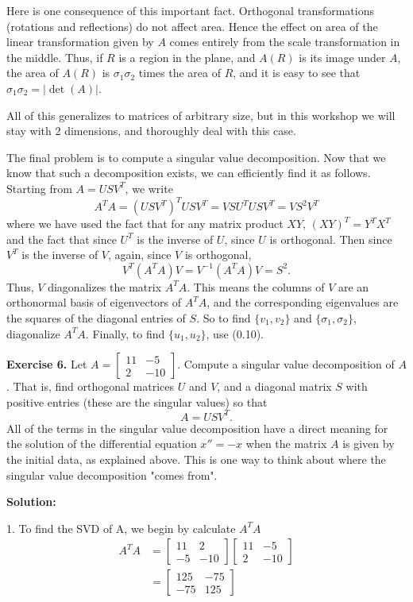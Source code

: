 \documentclass[12pt]{article}
\begin{document}
Here is one consequence of this important fact. Orthogonal transformations (rotations and reflections) do not affect area. Hence the effect on area of the linear transformation given by $A$ comes entirely from the scale transformation in the middle. Thus, if $R$ is a region in the plane, and $A(R)$ is its image under $A$, the area of $A(R)$ is $\sigma_{1}\sigma_{2}$ times the area of $R$, and it is easy to see that $\sigma_{1}\sigma_{2}=|\det(A)|$.

All of this generalizes to matrices of arbitrary size, but in this workshop we will stay with 2 dimensions, and thoroughly deal with this case.

The final problem is to compute a singular value decomposition. Now that we know that such a decomposition exists, we can efficiently find it as follows. Starting from $A=USV^{T}$, we write
\[
    A^{T}A=(USV^{T})^{T}USV^{T}=VSU^{T}USV^{T}=VS^{2}V^{T}
\]
where we have used the fact that for any matrix product $XY$, $(XY)^{T}=Y^{T}X^{T}$ and the fact that since $U^{T}$ is the inverse of $U$, since $U$ is orthogonal. Then since $V^{T}$ is the inverse of $V$, again, since $V$ is orthogonal,
\[
    V^{T}(A^{T}A)V=V^{-1}(A^{T}A)V=S^{2}.
\]
Thus, $V$ diagonalizes the matrix $A^{T}A$. This means the columns of $V$ are an orthonormal basis of eigenvectors of $A^{T}A$, and the corresponding eigenvalues are the squares of the diagonal entries of $S$. So to find $\{v_{1},v_{2}\}$ and $\{\sigma_{1},\sigma_{2}\}$, diagonalize $A^{T}A$. Finally, to find $\{u_{1},u_{2}\}$, use (0.10).

\bigskip
\noindent \textbf{Exercise 6.} Let $A=\begin{bmatrix}11&-5\\ 2&-10\end{bmatrix}.$
Compute a singular value decomposition of $A$. That is, find orthogonal matrices $U$ and $V$, and a diagonal matrix $S$ with positive entries (these are the singular values) so that
\[
    A=USV^{T}.
\]
All of the terms in the singular value decomposition have a direct meaning for the solution of the differential equation $x''=-x$ when the matrix $A$ is given by the initial data, as explained above. This is one way to think about where the singular value decomposition "comes from".

\textbf{Solution:}

1. To find the SVD of A, we begin by calculate $A^TA$
\begin{align*}
    A^TA & = \begin{bmatrix} 11 & 2 \\ -5 & -10 \end{bmatrix}  \begin{bmatrix} 11 & -5 \\ 2 & -10 \end{bmatrix} \\
         & = \begin{bmatrix} 125 & -75 \\ -75 & 125 \end{bmatrix}
\end{align*}
\end{document}
